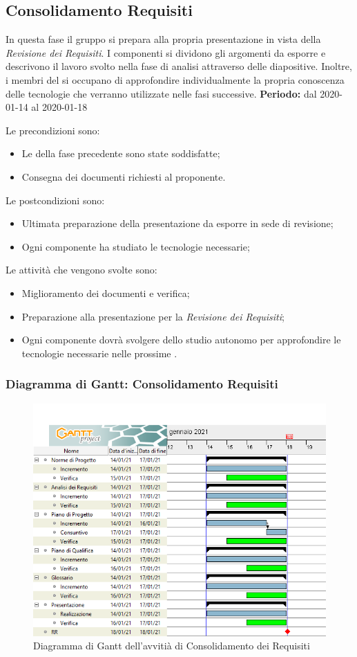 \subsection{Consolidamento Requisiti}
\label{consolidamento_requisiti}
In questa fase il gruppo si prepara alla propria presentazione in vista della \textit{Revisione dei Requisiti}.
I componenti si dividono gli argomenti da esporre e descrivono il lavoro svolto nella fase di analisi attraverso delle diapositive.
Inoltre, i membri del  si occupano di approfondire individualmente la propria conoscenza delle tecnologie che verranno utilizzate nelle fasi successive.
\textbf{Periodo:} dal 2020-01-14 al 2020-01-18

Le precondizioni sono:
\begin{itemize}
    \item Le  della fase precedente sono state soddisfatte;
    \item Consegna dei documenti richiesti al proponente.
\end{itemize}
Le postcondizioni sono:
\begin{itemize}
    \item Ultimata preparazione della presentazione da esporre in sede di revisione;
    \item Ogni componente ha studiato le tecnologie necessarie;
\end{itemize}
	
Le attività che vengono svolte sono:
\begin{itemize}
    \item Miglioramento dei documenti e verifica;
    \item Preparazione alla presentazione per la \textit{Revisione dei Requisiti};
    \item Ogni componente dovrà svolgere dello studio autonomo per approfondire le tecnologie necessarie nelle prossime .  
\end{itemize}

\subsubsection{Diagramma di Gantt: Consolidamento Requisiti}
\begin{figure}[ht]
    \centering
    \includegraphics[width=\textwidth]{../../Immagini/Consolidamento.png}
    \caption{Diagramma di Gantt dell'avvitià di Consolidamento dei Requisiti}
\end{figure}
